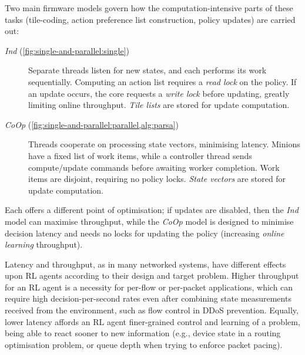 \documentclass[
sigconf,natbib=false
]{acmart}
\newcommand{\Coopfw}{\emph{CoOp}}
\newcommand{\coopfw}{\Coopfw}
\newcommand{\Indfw}{\emph{Ind}}
\newcommand{\indfw}{\Indfw}
\begin{document}
Two main firmware models govern how the computation-intensive parts of these tasks (tile-coding, action preference list construction, policy updates) are carried out:
\begin{description}
	\item[\Indfw{} (\cref{fig:single-and-parallel:single})] Separate threads listen for new states, and each performs its work sequentially. Computing an action list requires a \emph{read lock} on the policy. If an update occurs, the core requests a \emph{write lock} before updating, greatly limiting online throughput. \emph{Tile lists} are stored for update computation.
	\item[\Coopfw{} (\cref{fig:single-and-parallel:parallel,alg:parsa})] Threads cooperate on processing state vectors, minimising latency. Minions have a fixed list of work items, while a controller thread sends compute/update commands before awaiting worker completion. Work items are disjoint, requiring no policy locks. \emph{State vectors} are stored for update computation.
\end{description}
Each offers a different point of optimisation; if updates are disabled, then the \emph{\indfw{}} model can maximise throughput, while the \emph{\coopfw{}} model is designed to minimise decision latency and needs no locks for updating the policy (increasing \emph{online learning} throughput).

Latency and throughput, as in many networked systems, have different effects upon RL agents according to their design and target problem.
Higher throughput for an RL agent is a necessity for per-flow or per-packet applications, which can require high decision-per-second rates even after combining state measurements received from the environment, such as flow control in DDoS prevention.
Equally, lower latency affords an RL agent finer-grained control and learning of a problem, being able to react sooner to new information (e.g., device state in a routing optimisation problem, or queue depth when trying to enforce packet pacing).
\end{document}
